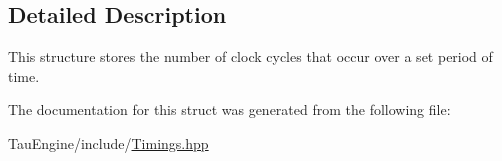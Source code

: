 \subsection{Detailed Description}
This structure stores the number of clock cycles that occur over a set period of time. 

The documentation for this struct was generated from the following file\+:\begin{DoxyCompactItemize}
\item 
Tau\+Engine/include/\mbox{\hyperlink{_timings_8hpp}{Timings.\+hpp}}\end{DoxyCompactItemize}
